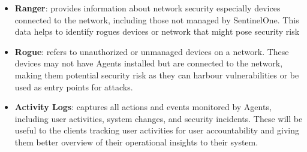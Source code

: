 \begin{itemize}
\begin{itemize}
            \end{itemize}
      \item \textbf{Ranger}: provides information about network security  especially devices connected to the network, including those not managed by SentinelOne. This data
            helps to identify rogues devices or network that might pose security risk
      \item \textbf{Rogue}: refers to unauthorized or unmanaged devices on a network. These devices may not have Agents installed but are connected to the network, making
            them potential security risk as they can harbour vulnerabilities or be used as entry points for attacks.
      \item \textbf{Activity Logs}: captures all actions and events monitored by Agents, including user activities, system changes, and security incidents. These
            will be useful to the clients tracking user activities for user accountability and giving them better overview of their operational insights to their
            system.
\end{itemize}

